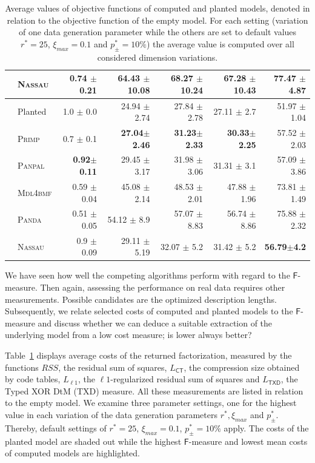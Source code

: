 \begin{table}
\begin{adjustbox}{max width=\textwidth}
\begin{tabular}{clrrrrr}
 & \textsc{Nassau} & 0.74 $\pm$ 0.21 & 64.43 $\pm$ 10.08 & 68.27 $\pm$ 10.24 & 67.28 $\pm$ 10.43 & 77.47 $\pm$ 4.87\\ \midrule
\rowcolor{black!10}
 \multirow{6}{*}{\cellcolor{white}\rotatebox{90}{ $\xi_{max}=0.3$ }  } 
&Planted &  1.0 $\pm$ 0.0  & 24.94 $\pm$ 2.74 & 27.84 $\pm$ 2.78 & 27.11 $\pm$ 2.7 & 51.97 $\pm$ 1.04\\
 & \textsc{Primp} & 0.7 $\pm$ 0.1  & \textbf{27.04}$\pm$\textbf{2.46} & \textbf{31.23}$\pm$\textbf{2.33} & \textbf{30.33}$\pm$\textbf{2.25} & 57.52 $\pm$ 2.03\\
 & \textsc{Panpal}  & \textbf{0.92}$\pm$\textbf{0.11} & 29.45 $\pm$ 3.17 & 31.98 $\pm$ 3.06 & 31.31 $\pm$ 3.1 & 57.09 $\pm$ 3.86\\
 & \textsc{Mdl4bmf} & 0.59 $\pm$ 0.04 & 45.08 $\pm$ 2.14 & 48.53 $\pm$ 2.01 & 47.88 $\pm$ 1.96 & 73.81 $\pm$ 1.49\\
 & \textsc{Panda} & 0.51 $\pm$ 0.05 & 54.12 $\pm$ 8.9 & 57.07 $\pm$ 8.83 & 56.74 $\pm$ 8.86 & 75.88 $\pm$ 2.32\\
 & \textsc{Nassau} & 0.9 $\pm$ 0.09 & 29.11 $\pm$ 5.19 & 32.07 $\pm$ 5.2 & 31.42 $\pm$ 5.2 & \textbf{56.79}$\pm$\textbf{4.2}\\ 
 \bottomrule
\end{tabular}
\end{adjustbox}
\caption{Average values of objective functions of computed and planted models, denoted in relation to the objective function of the empty model. For each setting (variation of one data generation parameter while the others are set to default values $r^*=25$, $\xi_{max}=0.1$ and $p_\pm^*=10\%$) the average value is computed over all considered dimension variations.}
\label{tbl:avgCosts}
\end{table}

We have seen how well the competing algorithms perform with regard to the $\mathsf{F}$-measure. Then again, assessing the performance on real data requires other measurements. Possible candidates are the optimized description lengths. Subsequently, we relate selected costs of computed and planted models to the $\mathsf{F}$-measure and discuss whether we can deduce a suitable extraction of the underlying model from a low cost measure; is lower always better? 

Table~\ref{tbl:avgCosts} displays average costs of the returned factorization, measured by the functions $RSS$, the residual sum of squares, $L_{\mathsf{CT}}$, the compression size obtained by code tables, $L_{\ell 1}$, the $\ell 1$-regularized residual sum of squares and $L_{\mathsf{TXD}}$, the Typed XOR DtM (TXD) measure. All these measurements are listed in relation to the empty model. We examine three parameter settings, one for the highest value in each variation of the data generation parameters $r^*, \xi_{max}$ and $p_\pm^*$. Thereby, default settings of $r^*=25$, $\xi_{max}=0.1$, $p_\pm^*=10\%$ apply. The costs of the planted model are shaded out while the highest $\mathsf{F}$-measure and lowest mean costs of computed models are highlighted. 

